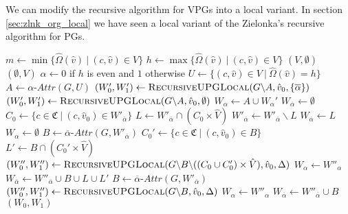 We can modify the recursive algorithm for VPGs into a local variant. In section \ref{sec:zlnk_org_local} we have seen a local variant of the Zielonka's recursive algorithm for PGs.

\begin{algorithm}
	\caption{$\textsc{RecursiveUPGLocal}(\textit{PG } G = (\\
		V \subseteq \mathfrak{C} \times \hat{V},\\
		\hat{V}_0 \subseteq \hat{V},\\
		\hat{V}_1 \subseteq \hat{V},\\
		E \subseteq (\mathfrak{C} \times \hat{V}) \times (\mathfrak{C} \times \hat{V}),\\
		\hat{\Omega} : \hat{V} \rightarrow \mathbb{N}),\\
		\hat{v}_0 \in \hat{V},\\
		\Delta \subseteq \{ 0,1\})$}
	\label{alg_zlnk_collective_local}
	\begin{algorithmic}[1]
		\State $m \gets \min\{ \hat{\Omega}(\hat{v})\ |\ (c,\hat{v}) \in V\}$
		\State $h \gets\max\{ \hat{\Omega}(\hat{v})\ |\ (c,\hat{v}) \in V\}$
		\State \Return $(V,\emptyset)$
		\Else
		\State \Return $(\emptyset, V)$
		\EndIf
		\EndIf
		\State $\alpha \gets 0$ if $h$ is even and $1$ otherwise
		\State $U \gets \{(c,\hat{v}) \in V\ |\ \hat{\Omega}(\hat{v}) = h\}$
		\State $A \gets \alpha\textit{-Attr}(G, U)$
		\If{$\overline{\alpha} \in \Delta$}
		\State $(W_0', W_1') \gets \textsc{RecursiveUPGLocal}(G \backslash A,\hat{v}_0,\{\overline{\alpha}\})$
		\Else
		\State $(W_0', W_1') \gets \textsc{RecursiveUPGLocal}(G \backslash A,\hat{v}_0,\emptyset)$
		\EndIf
		\State $W_\alpha \gets A \cup W_\alpha'$
		\State $W_{\overline{\alpha}} \gets \emptyset$
		\Else
		\If{$\overline{\alpha} \in \Delta$}
			\State $C_0 \gets \{c \in \mathfrak{C}\ |\ (c,\hat{v}_0) \in W'_{\overline{\alpha}}\}$
			\State $L \gets W'_{\overline{\alpha}} \cap (C_0 \times \hat{V})$
			\State $W'_{\overline{\alpha}} \gets W'_{\overline{\alpha}} \backslash L$
				\State $W_{\overline{\alpha}} \gets L$
				\State $W_\alpha \gets \emptyset$
			\Else
			\State $B \gets \overline{\alpha}\textit{-Attr}(G, W'_{\overline{\alpha}})$
			\State $C_0' \gets \{c \in \mathfrak{C}\ |\ (c,\hat{v}_0) \in B\}$
			\State $L' \gets B \cap (C_0' \times \hat{V})$
			\State $(W_0'', W_1'') \gets \textsc{RecursiveUPGLocal}(G \backslash B \backslash ((C_0 \cup C_0') \times \hat{V}), \hat{v}_0, \Delta)$
			\State $W_\alpha \gets W''_\alpha$
			\State $W_{\overline{\alpha}} \gets W''_{\overline{\alpha}} \cup B \cup L \cup L'$
			\EndIf
		\Else
			\State $B \gets \overline{\alpha}\textit{-Attr}(G, W'_{\overline{\alpha}})$
			\State $(W_0'', W_1'') \gets \textsc{RecursiveUPGLocal}(G \backslash B, \hat{v}_0, \Delta)$
			\State $W_\alpha \gets W''_\alpha$
			\State $W_{\overline{\alpha}} \gets W''_{\overline{\alpha}} \cup B$
		\EndIf
		\EndIf
		\State \Return $(W_0, W_1)$
	\end{algorithmic}
\end{algorithm}